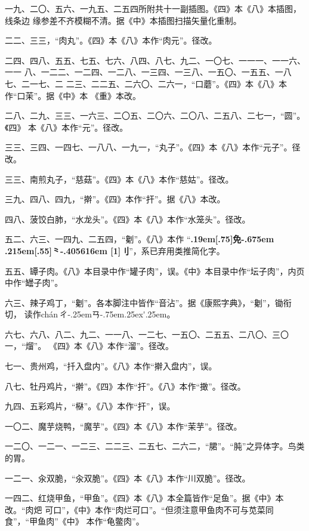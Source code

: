 \begin{list}{}
一九、二〇、五六、一九五、二五四所附共十一副插图。《四》本《八》本插图，线条边
缘参差不齐模糊不清。据《中》本插图扫描矢量化重制。

二二、三三，“肉丸”。《四》本《八》本作“肉元”。径改。

二四、四八、五五、七五、七六、八四、八七、九二、一〇七、一一一、一一六、一一
八、一二二、一二四、一二八、一三四、一三八、一五〇、一五五、一八七、二一七、二
二三、二二五、二六〇、二六一，“口蘑”。《四》本《八》本作“口茉”。据《中》本
《重》本改。

二八、二九、三三、一六三、二〇五、二〇六、二〇八、二五八、二七一，“圆”。《四》
本《八》本作“元”。径改。

三三、三四、一四七、一八八、一九一，“丸子”。《四》本《八》本作“元子”。径改。

三三、南煎丸子，“慈菇”。《四》本《八》本作“慈姑”。径改。

三九、四八、四九，“擀”。《四》本作“扞”。据《八》本改。

四八、菠饺白肺，“水龙头”。《四》本《八》本作“水笼头”。径改。

五二、六三、一四九、二五四，“劖”。《八》本作
“{\bfseries\raise.19em\hbox{\scalebox{.675}[.75]{免}}\kern-.675em%
\lower.215em\hbox{\scalebox{.95}[.55]{⺀}}\kern-.405616em%
\scalebox{.65}[1]{刂}}”，系已弃用类推简化字。

五五、罈子肉。《八》本目录中作“罐子肉”，误。《中》本目录中作“坛子肉”，内页
中作“罎子肉”。

六三、辣子鸡丁，“劖”。各本脚注中皆作“音沾”。据《康熙字典》，“劖”，锄衔切，
读作{ch\'{a}n}\,{ㄔ\kern-.25emㄢ\kern-.75em\raise.25ex\hbox{\'{}}\kern.25em}。

六七、六八、八二、九二、一一八、一二七、一五〇、二五五、二八〇、三〇一，“熘”。
《四》本《八》本作“溜”。径改。

七一、贵州鸡，“扦入盘内”。《八》本作“擀入盘内”，误。

八七、牡丹鸡片，“擀”。《四》本作“扞”。《八》本作“撖”。径改。

九四、五彩鸡片，“㮟”。《八》本作“扞”，误。

一〇二、魔芋烧鸭，“魔芋”。《四》本《八》本作“茉芋”。径改。

一二〇、一二一、一二三、二二三、二五七、二六二，“𬂁”。“肫”之异体字。鸟类的胃。

一二一、汆双脆，“汆双脆”。《四》本《八》本作“川双脆”。径改。

一四二、红烧甲鱼，“甲鱼”。《四》本《八》本全篇皆作“足鱼”。据《中》本改。“肉𤆵
可口”，《中》本作“肉烂可口”。“但须注意甲鱼肉不可与苋菜同食”，“甲鱼肉”《中》
本作“龟鳖肉”。


\end{list}
